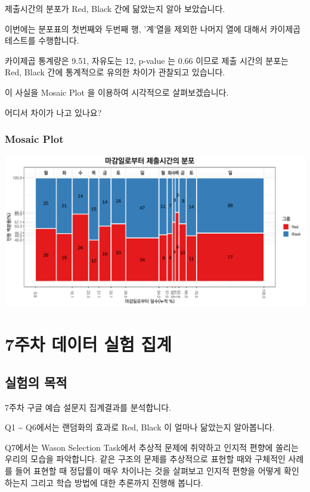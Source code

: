 \documentclass[
]{book}
\begin{document}
제출시간의 분포가 Red, Black 간에 닮았는지 알아 보았습니다.

이번에는 분포표의 첫번째와 두번째 행, '계'열을 제외한 나머지 열에 대해서 카이제곱테스트를 수행합니다.

카이제곱 통계량은 9.51, 자유도는 12, p-value 는 0.66 이므로 제출 시간의 분포는 Red, Black 간에 통계적으로 유의한 차이가 관찰되고 있습니다.

이 사실을 Mosaic Plot 을 이용하여 시각적으로 살펴보겠습니다.

어디서 차이가 나고 있나요?

\subsection{Mosaic Plot}\label{mosaic-plot-11}

\includegraphics{Quiz_report_2025_files/figure-latex/unnamed-chunk-167-1.pdf}

\chapter{7주차 데이터 실험 집계}\label{uxc8fcuxcc28-uxb370uxc774uxd130-uxc2e4uxd5d8-uxc9d1uxacc4-6}

\section{실험의 목적}\label{uxc2e4uxd5d8uxc758-uxbaa9uxc801-6}

7주차 구글 예습 설문지 집계결과를 분석합니다.

Q1 \textasciitilde{} Q6에서는 랜덤화의 효과로 Red, Black 이 얼마나 닮았는지 알아봅니다.

Q7에서는 Wason Selection Task에서 추상적 문제에 취약하고 인지적 편향에 쏠리는 우리의 모습을 파악합니다. 같은 구조의 문제를 추상적으로 표현할 때와 구체적인 사례를 들어 표현할 때 정답률이 매우 차이나는 것을 살펴보고 인지적 편향을 어떻게 확인하는지 그리고 학습 방법에 대한 추론까지 진행해 봅니다.
\end{document}
